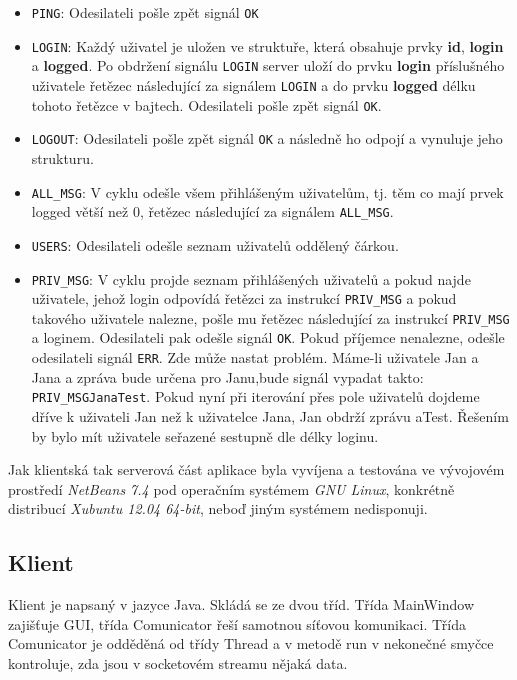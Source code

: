 \documentclass[11pt, titlepage]{article}
\begin{document}
\begin{itemize}
 \item \texttt{PING}: Odesilateli pošle zpět signál \texttt{OK}
 \item \texttt{LOGIN}: Každý uživatel je uložen ve struktuře, která obsahuje prvky \textbf{id}, \textbf{login} a \textbf{logged}. Po obdržení signálu \texttt{LOGIN} server uloží do prvku \textbf{login} příslušného uživatele řetězec následující za signálem \texttt{LOGIN} a do prvku \textbf{logged} délku tohoto řetězce v bajtech. Odesilateli pošle zpět signál \texttt{OK}.
 \item \texttt{LOGOUT}: Odesilateli pošle zpět signál \texttt{OK} a následně ho odpojí a vynuluje jeho strukturu.
 \item \texttt{ALL\_MSG}: V cyklu odešle všem přihlášeným uživatelům, tj. těm co mají prvek logged větší než 0, řetězec následující za signálem \texttt{ALL\_MSG}.
 \item \texttt{USERS}: Odesilateli odešle seznam uživatelů oddělený čárkou.
 \item \texttt{PRIV\_MSG}: V cyklu projde seznam přihlášených uživatelů a pokud najde uživatele, jehož login odpovídá řetězci za instrukcí \texttt{PRIV\_MSG} a pokud takového uživatele nalezne, pošle mu řetězec následující za instrukcí \texttt{PRIV\_MSG} a loginem. Odesilateli pak odešle signál \texttt{OK}. Pokud příjemce nenalezne, odešle odesilateli signál \texttt{ERR}. Zde může nastat problém. Máme-li uživatele Jan a Jana a zpráva bude určena pro Janu,bude signál vypadat takto: \texttt{PRIV\_MSGJanaTest}. Pokud nyní při iterování přes pole uživatelů dojdeme dříve k uživateli Jan než k uživatelce Jana, Jan obdrží zprávu aTest. Řešením by bylo mít uživatele seřazené sestupně dle délky loginu.
\end{itemize}

Jak klientská tak serverová část aplikace byla vyvíjena a testována ve vývojovém prostředí \textit{NetBeans 7.4} pod operačním systémem \textit{GNU Linux}, konkrétně distribucí \textit{Xubuntu 12.04 64-bit}, neboď jiným systémem nedisponuji.

\subsection{Klient} 
Klient je napsaný v jazyce Java. Skládá se ze dvou tříd. Třída MainWindow zajišťuje GUI, třída Comunicator řeší samotnou síťovou komunikaci. Třída Comunicator je odděděná od třídy Thread a v metodě run v nekonečné smyčce kontroluje, zda jsou v socketovém streamu nějaká data.
\end{document}
